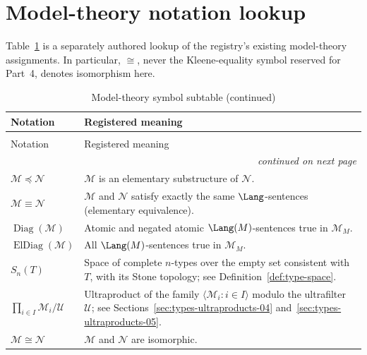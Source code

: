 \section{Model-theory notation lookup}
\label{sec:p03-model-symbols}

Table~\ref{tab:p03-model-symbols} is a separately authored lookup of the
registry's existing model-theory assignments.  In particular,
\(\cong\), never the Kleene-equality symbol reserved for Part~4, denotes
isomorphism here.

\begingroup\small
\begin{longtable}{@{}p{}p{}@{}}
\caption{Model-theory symbol subtable.}
\label{tab:p03-model-symbols}\\
\toprule
Notation & Registered meaning \\
\midrule
\endfirsthead
\caption[]{Model-theory symbol subtable (continued)}\\
\toprule
Notation & Registered meaning \\
\midrule
\endhead
\midrule\multicolumn{2}{r}{\emph{continued on next page}}\\
\endfoot
\endlastfoot
\(\mathcal M\preccurlyeq\mathcal N\) &
  \(\mathcal M\) is an elementary substructure of \(\mathcal N\). \\
\addlinespace
\(\mathcal M\equiv\mathcal N\) &
  \(\mathcal M\) and \(\mathcal N\) satisfy exactly the same
  \(\Lang\)-sentences (elementary equivalence). \\
\addlinespace
\(\operatorname{Diag}(\mathcal M)\) &
  Atomic and negated atomic \(\Lang(M)\)-sentences true in \(\mathcal M_M\). \\
\addlinespace
\(\operatorname{ElDiag}(\mathcal M)\) &
  All \(\Lang(M)\)-sentences true in \(\mathcal M_M\). \\
\addlinespace
\(S_n(T)\) &
  Space of complete \(n\)-types over the empty set consistent with \(T\), with
  its Stone topology; see Definition~\ref{def:type-space}. \\
\addlinespace
\(\displaystyle\prod_{i\in I}\mathcal M_i/\mathcal U\) &
  Ultraproduct of the family \(\langle\mathcal M_i:i\in I\rangle\) modulo
  the ultrafilter \(\mathcal U\); see
  Sections~\ref{sec:types-ultraproducts-04}
  and~\ref{sec:types-ultraproducts-05}. \\
\addlinespace
\(\mathcal M\cong\mathcal N\) &
  \(\mathcal M\) and \(\mathcal N\) are isomorphic. \\
\bottomrule
\end{longtable}
\endgroup
